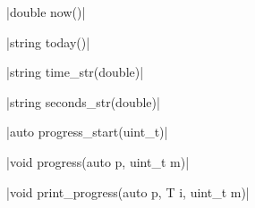 \item \cppinline|double now()| 

\item \cppinline|string today()| 

\item \cppinline|string time_str(double)| 

\item \cppinline|string seconds_str(double)| 

\item \cppinline|auto progress_start(uint_t)| 

\cppinline|void progress(auto p, uint_t m)| 

\cppinline|void print_progress(auto p, T i, uint_t m)| 
